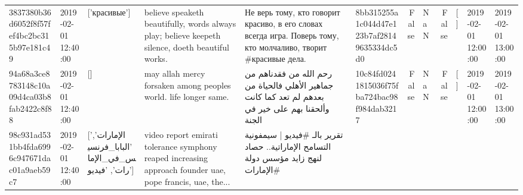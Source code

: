 \begin{tabular}{llllllrlrlll}
3837380b36d6052f8f57fef4bc2bc315b97e181c49 & 2019-02-01 12:40:00 & ['красивые'] & believe speaketh beautifully, words always play; believe keepeth silence, doeth beautiful works. & Не верь тому, кто говорит красиво, в его словах всегда игра. Поверь тому, кто молчаливо, творит \#красивые дела. & 8bb315255a1c044d47e123b7af28149635334dc5d0 & False & NaN & False & [] & 2019-02-01 12:00:00 & 2019-02-01 13:00:00 \\
94a68a3ce8783148c10a09d4ca03b8fab2422c8f88 & 2019-02-01 12:40:00 & [] & may allah mercy forsaken among peoples world. life longer same. & رحم الله من فقدناهم من جماهير الأهلي فالحياة من بعدهم لم تعد كما كانت وألحقنا بهم على خير في الجنة & 10c84fd0241815036f75fba724bac98f984dab3217 & False & NaN & False & [] & 2019-02-01 12:00:00 & 2019-02-01 13:00:00 \\
98c931ad531bb4fda6996c947671dac01a9aeb59c7 & 2019-02-01 12:40:00 & ['الإمارات', 'البابا_فرنسيس_في_الإمارات', 'فيديو'] & video report emirati tolerance symphony reaped increasing approach founder uae, pope francis, uae, the... & تقرير بالـ \#فيديو | سيمفونية التسامح الإماراتية.. حصاد لنهج زايد مؤسس دولة \#الإمارات


\end{tabular}
